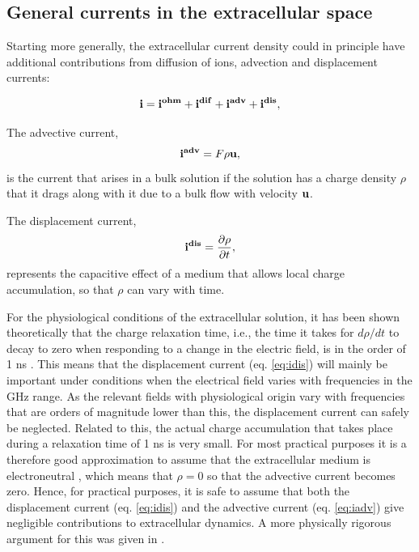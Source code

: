 \subsection{General currents in the extracellular space}
Starting more generally, the extracellular current density could in principle have additional contributions from  diffusion of ions, advection and displacement currents: 

\begin{equation}
{\bf i} = {\bf i^{ohm}} + {\bf i^{dif}} + {\bf i^{adv}} + {\bf i^{dis}}, 
\label{eq:generalcurrent}
\end{equation}

The advective current, 
\begin{equation}
{\bf i^{adv}} = F \rho {\bf u}, 
\label{eq:iadv}
\end{equation}
is the current that arises in a bulk solution if the solution has a charge density $\rho$ that it drags along with it due to a bulk flow with velocity ${\bf u}$. 

The displacement current,
\begin{equation}
{\bf i^{dis}} = \frac{\partial \rho}{\partial t},
\label{eq:idis}
\end{equation}
represents the capacitive effect of a medium that allows local charge accumulation, so that $\rho$ can vary with time.  

For the physiological conditions of the extracellular solution, it has been shown theoretically that the charge relaxation time, i.e., the time it takes for $d\rho/dt$ to decay to zero when responding to a change in the electric field, is in the order of 1 ns \cite{Grodzinsky2011, Gratiy2017}. This means that the displacement current (eq. \ref{eq:idis}) will mainly be important under conditions when the electrical field varies with frequencies in the GHz range. As the relevant fields with physiological origin vary with frequencies that are orders of magnitude lower than this, the displacement current can safely be neglected. Related to this, the actual charge accumulation that takes place during a relaxation time of 1 ns is very small. For most practical purposes it is a therefore good approximation to assume that the extracellular medium is electroneutral \cite{Solbra2018}, which means that $\rho = 0$ so that the advective current becomes zero. Hence, for practical purposes, it is safe to assume that both the displacement current (eq. \ref{eq:idis}) and the advective current (eq. \ref{eq:iadv}) give negligible contributions to extracellular dynamics. A more physically rigorous argument for this was given in \cite{Gratiy2017}. 

